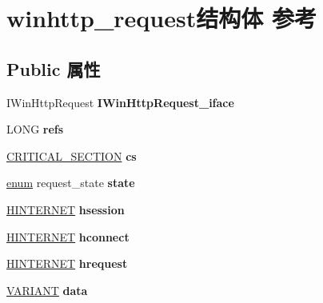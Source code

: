 \hypertarget{structwinhttp__request}{}\section{winhttp\+\_\+request结构体 参考}
\label{structwinhttp__request}
\subsection*{Public 属性}
\begin{DoxyCompactItemize}
\item 
\mbox{\label{structwinhttp__request_a6e5bd49fc8ff7f4f8ca065ebd49d32dd}} 
I\+Win\+Http\+Request {\bfseries I\+Win\+Http\+Request\+\_\+iface}
\item 
\mbox{\label{structwinhttp__request_a8b27092331779aa6e46fe8c38d5fe170}} 
L\+O\+NG {\bfseries refs}
\item 
\mbox{\label{structwinhttp__request_ad91c712eb1cdc87fa0061c7bb61a481f}} 
\hyperlink{struct___c_r_i_t_i_c_a_l___s_e_c_t_i_o_n}{C\+R\+I\+T\+I\+C\+A\+L\+\_\+\+S\+E\+C\+T\+I\+ON} {\bfseries cs}
\item 
\mbox{\label{structwinhttp__request_aef576d7863de11cf6d3bfa9644f37f3f}} 
\hyperlink{interfaceenum}{enum} request\+\_\+state {\bfseries state}
\item 
\mbox{\label{structwinhttp__request_abee714324a0804806e45d4721e62ea12}} 
\hyperlink{interfacevoid}{H\+I\+N\+T\+E\+R\+N\+ET} {\bfseries hsession}
\item 
\mbox{\label{structwinhttp__request_aacb98537c5327f63796b7a3400d6873b}} 
\hyperlink{interfacevoid}{H\+I\+N\+T\+E\+R\+N\+ET} {\bfseries hconnect}
\item 
\mbox{\label{structwinhttp__request_a6c3a8a582452d4eb11ff4b0bbb7f3235}} 
\hyperlink{interfacevoid}{H\+I\+N\+T\+E\+R\+N\+ET} {\bfseries hrequest}
\item 
\mbox{\label{structwinhttp__request_a0a2d8402966e8bd688d487dccfdd8378}} 
\hyperlink{structtag_v_a_r_i_a_n_t}{V\+A\+R\+I\+A\+NT} {\bfseries data}

\end{DoxyCompactItemize}
